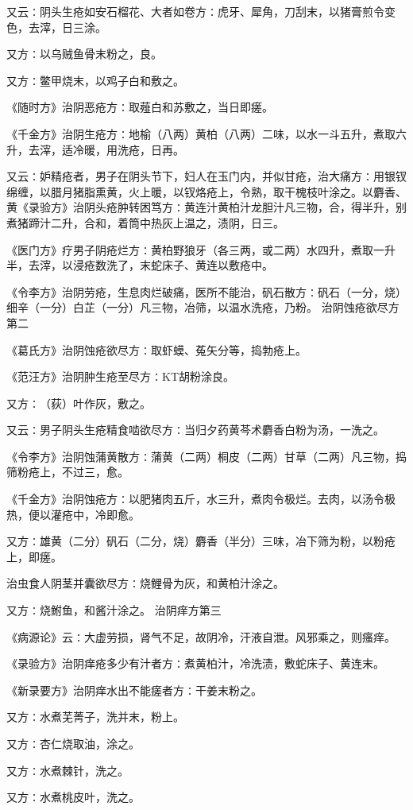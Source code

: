 \documentclass[a4paper,12pt,UTF8,twoside]{ctexbook}
\begin{document}
又云∶阴头生疮如安石榴花、大者如卷方∶虎牙、犀角，刀刮末，以猪膏煎令变色，去滓，日三涂。

又方∶以乌贼鱼骨末粉之，良。

又方∶鳖甲烧末，以鸡子白和敷之。

《随时方》治阴恶疮方∶取薤白和苏敷之，当日即瘥。

《千金方》治阴生疮方∶地榆（八两）黄柏（八两）二味，以水一斗五升，煮取六升，去滓，适冷暖，用洗疮，日再。

又云∶妒精疮者，男子在阴头节下，妇人在玉门内，并似甘疮，治大痛方∶用银钗绵缠，以腊月猪脂熏黄，火上暖，以钗烙疮上，令熟，取干槐枝叶涂之。以麝香、黄《录验方》治阴头疮肿转困笃方∶黄连汁黄柏汁龙胆汁凡三物，合，得半升，别煮猪蹄汁二升，合和，着筒中热灰上温之，渍阴，日三。

《医门方》疗男子阴疮烂方∶黄柏野狼牙（各三两，或二两）水四升，煮取一升半，去滓，以浸疮数洗了，末蛇床子、黄连以敷疮中。

《令李方》治阴劳疮，生息肉烂破痛，医所不能治，矾石散方∶矾石（一分，烧）细辛（一分）白芷（一分）凡三物，冶筛，以温水洗疮，乃粉。
治阴蚀疮欲尽方第二

《葛氏方》治阴蚀疮欲尽方∶取虾蟆、菟矢分等，捣勃疮上。

《范汪方》治阴肿生疮至尽方∶KT胡粉涂良。

又方∶（荻）叶作灰，敷之。

又云∶男子阴头生疮精食啮欲尽方∶当归夕药黄芩术麝香白粉为汤，一洗之。

《令李方》治阴蚀蒲黄散方∶蒲黄（二两）桐皮（二两）甘草（二两）凡三物，捣筛粉疮上，不过三，愈。

《千金方》治阴蚀疮方∶以肥猪肉五斤，水三升，煮肉令极烂。去肉，以汤令极热，便以灌疮中，冷即愈。

又方∶雄黄（二分）矾石（二分，烧）麝香（半分）三味，冶下筛为粉，以粉疮上，即瘥。

治虫食人阴茎并囊欲尽方∶烧鲤骨为灰，和黄柏汁涂之。

又方∶烧鲋鱼，和酱汁涂之。
治阴痒方第三

《病源论》云∶大虚劳损，肾气不足，故阴冷，汗液自泄。风邪乘之，则瘙痒。

《录验方》治阴痒疮多少有汁者方∶煮黄柏汁，冷洗渍，敷蛇床子、黄连末。

《新录要方》治阴痒水出不能瘥者方∶干姜末粉之。

又方∶水煮芜菁子，洗并末，粉上。

又方∶杏仁烧取油，涂之。

又方∶水煮棘针，洗之。

又方∶水煮桃皮叶，洗之。
\end{document}
